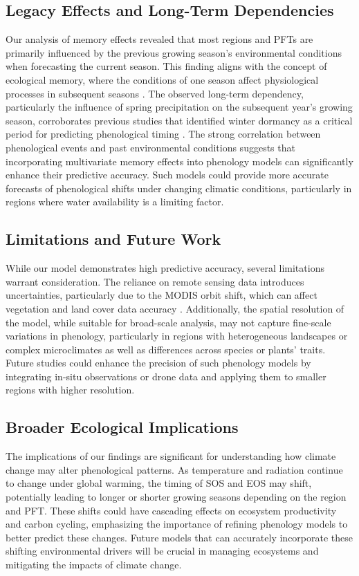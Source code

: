 \documentclass[pdflatex,sn-mathphys-num]{sn-jnl}%
\theoremstyle{thmstyleone}%
\theoremstyle{thmstyletwo}%
\theoremstyle{thmstylethree}%
\begin{document}
\subsection{Legacy Effects and Long-Term Dependencies}\label{subsec2}
Our analysis of memory effects revealed that most regions and PFTs are primarily influenced by the previous growing season's environmental conditions when forecasting the current season. This finding aligns with the concept of ecological memory, where the conditions of one season affect physiological processes in subsequent seasons \cite{ogle_quantifying_2015}. The observed long-term dependency, particularly the influence of spring precipitation on the subsequent year’s growing season, corroborates previous studies that identified winter dormancy as a critical period for predicting phenological timing \cite{chuine_warming_2010, hanninen_dynamic_2016}.
The strong correlation between phenological events and past environmental conditions suggests that incorporating multivariate memory effects into phenology models can significantly enhance their predictive accuracy. Such models could provide more accurate forecasts of phenological shifts under changing climatic conditions, particularly in regions where water availability is a limiting factor.

\subsection{Limitations and Future Work}\label{subsec2}

While our model demonstrates high predictive accuracy, several limitations warrant consideration. The reliance on remote sensing data introduces uncertainties, particularly due to the MODIS orbit shift, which can affect vegetation and land cover data accuracy . Additionally, the spatial resolution of the model, while suitable for broad-scale analysis, may not capture fine-scale variations in phenology, particularly in regions with heterogeneous landscapes or complex microclimates as well as differences across species or plants’ traits. Future studies could enhance the precision of such phenology models by integrating in-situ observations or drone data and applying them to smaller regions with higher resolution.

\subsection{Broader Ecological Implications}\label{subsec2}
The implications of our findings are significant for understanding how climate change may alter phenological patterns. As temperature and radiation continue to change under global warming, the timing of SOS and EOS may shift, potentially leading to longer or shorter growing seasons depending on the region and PFT. These shifts could have cascading effects on ecosystem productivity and carbon cycling, emphasizing the importance of refining phenology models to better predict these changes. Future models that can accurately incorporate these shifting environmental drivers will be crucial in managing ecosystems and mitigating the impacts of climate change.
\end{document}
